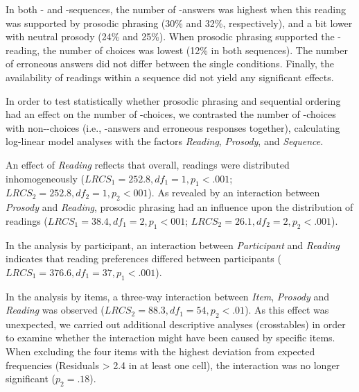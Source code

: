 \documentclass[fleqn,reqno,10pt,draft]{article}
\newcommand{\lc}{\acro{lc}}
\newcommand{\ec}{\acro{ec}}
\begin{document}
In both \lc- and \ec-sequences, the number of \ec-answers was highest
when this reading was supported by prosodic phrasing (30\% and
32\%, respectively), and a bit lower with neutral prosody (24\% and
25\%). When prosodic phrasing supported the \lc-reading, the number of
\ec choices was lowest (12\% in both sequences). The number of
erroneous answers did not differ between the single
conditions. Finally, the availability of readings within a sequence
did not yield any significant effects.


In order to test statistically whether prosodic phrasing and
sequential ordering had an effect on the number of \ec-choices, we
contrasted the number of \ec-choices with non-\ec -choices (i.e.,
\lc-answers and erroneous responses together), calculating log-linear
model analyses with the factors {\it Reading}, {\it Prosody}, and {\it
  Sequence}.

An effect of {\it Reading} reflects that overall, readings were distributed inhomogeneously
($LRCS_1 = 252.8, df_1 =1, p_1 < .001$; $LRCS_2 = 252.8, df_2 =1, p_2 < 001$). 
As revealed by an interaction between {\it Prosody} and
{\it Reading}, prosodic phrasing had an influence upon the distribution of readings 
($LRCS_1 = 38.4, df_1 =2, p_1 < 001$; $LRCS_2 = 26.1, df_2 =2, p_2 < .001$). 

In the analysis by participant, an interaction between {\it Participant} and {\it Reading}
indicates that reading preferences differed between participants ($LRCS_1 = 376.6,df_1 =37,  
p_1 < .001$). 

In the analysis by items, a three-way interaction between {\it Item}, {\it Prosody} and 
{\it Reading} was observed ($LRCS_2 = 88.3, df_1 =54, p_2 < .01$). As this effect was 
unexpected, we carried out additional descriptive analyses (crosstables) in order to examine whether
the interaction might have been caused by specific items. When excluding the four items with
the highest deviation from expected frequencies (Residuals > 2.4 in at least one cell), 
the interaction was no longer significant ($p_2 = .18$).
\end{document}
